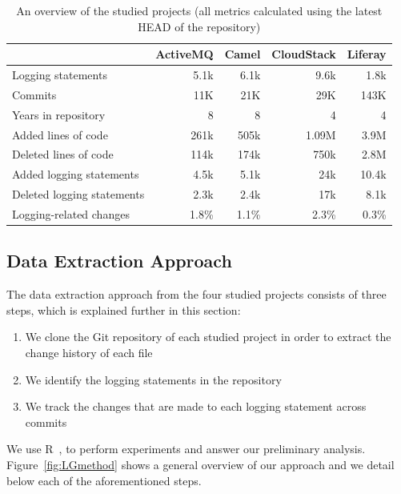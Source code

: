 \begin{table}[tb]
	\centering \protect\protect\caption{An overview of the studied projects (all metrics calculated using the latest HEAD of the repository) }
	\smaller
	
	\label{tba:overviewsystems} %
	\begin{tabular}{>{\centering}p{}rrrr}
		\toprule 
		~ & \textbf{ActiveMQ}  & \textbf{Camel}  & \textbf{CloudStack}  & \textbf{Liferay} \\
		\midrule
		Logging statements & 5.1k  & 6.1k  & 9.6k  & 1.8k \\
		Commits &	 11K  & 21K  & 29K  & 143K \\	
		Years in repository&	 8  & 8  & 4  & 4 \\
		\midrule
		Added lines of code  & 261k  & 505k  & 1.09M  & 3.9M \\
		Deleted lines of code  & 114k  & 174k  & 750k  & 2.8M \\
		Added logging statements  & 4.5k  & 5.1k  & 24k  & 10.4k \\
		Deleted logging statements  & 2.3k & 2.4k  & 17k  & 8.1k \\
		Logging-related changes & 1.8\% & 1.1\% & 2.3\% & 0.3\% \\
		\bottomrule 
	\end{tabular}
\end{table}

\subsection{Data Extraction Approach}

The data extraction approach from the four studied projects consists of three steps, which is explained further in this section: 

\begin{enumerate}
\item We clone the Git repository of each studied project in order to extract the change history of each file 
\item We identify the logging statements in the repository%
\item We track the changes that are made to each logging statement across commits 
\end{enumerate}

We use R~\cite{ihaka1996r}, to perform experiments and answer our preliminary analysis. Figure~\ref{fig:LGmethod} shows a general overview of our approach and we detail below each of the aforementioned steps. 

